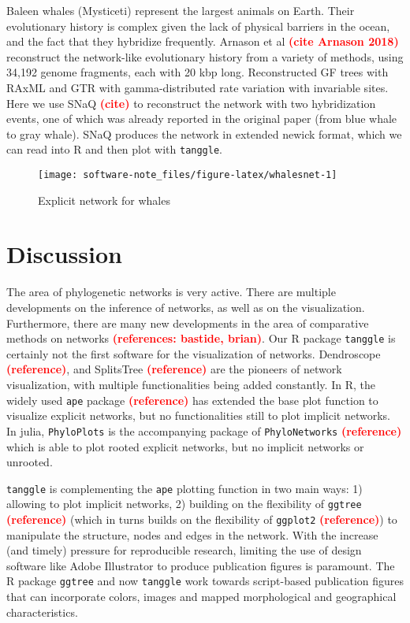 \documentclass[]{IEEEtran}
\begin{document}
Baleen whales (Mysticeti) represent the largest animals on Earth. Their
evolutionary history is complex given the lack of physical barriers in
the ocean, and the fact that they hybridize frequently. Arnason et al
\textcolor{red}{\textbf{(cite Arnason 2018)}} reconstruct the
network-like evolutionary history from a variety of methods, using
34,192 genome fragments, each with 20 kbp long. Reconstructed GF trees
with RAxML and GTR with gamma-distributed rate variation with invariable
sites. Here we use SNaQ \textcolor{red}{\textbf{(cite)}} to reconstruct
the network with two hybridization events, one of which was already
reported in the original paper (from blue whale to gray whale). SNaQ
produces the network in extended newick format, which we can read into R
and then plot with \texttt{tanggle}.

\begin{figure}[H]

{\centering \texttt{[image: software-note\_files/figure-latex/whalesnet-1]} 

}

\caption{Explicit network for whales}\label{fig:whalesnet}
\end{figure}

\hypertarget{discussion}{%
\section{Discussion}\label{discussion}}

The area of phylogenetic networks is very active. There are multiple
developments on the inference of networks, as well as on the
visualization. Furthermore, there are many new developments in the area
of comparative methods on networks
\textcolor{red}{\textbf{(references: bastide, brian)}}. Our R package
\texttt{tanggle} is certainly not the first software for the
visualization of networks. Dendroscope
\textcolor{red}{\textbf{(reference)}}, and SplitsTree
\textcolor{red}{\textbf{(reference)}} are the pioneers of network
visualization, with multiple functionalities being added constantly. In
R, the widely used \texttt{ape} package
\textcolor{red}{\textbf{(reference)}} has extended the base plot
function to visualize explicit networks, but no functionalities still to
plot implicit networks. In julia, \texttt{PhyloPlots} is the
accompanying package of \texttt{PhyloNetworks}
\textcolor{red}{\textbf{(reference)}} which is able to plot rooted
explicit networks, but no implicit networks or unrooted.

\texttt{tanggle} is complementing the \texttt{ape} plotting function in
two main ways: 1) allowing to plot implicit networks, 2) building on the
flexibility of \texttt{ggtree} \textcolor{red}{\textbf{(reference)}}
(which in turns builds on the flexibility of \texttt{ggplot2}
\textcolor{red}{\textbf{(reference)}}) to manipulate the structure,
nodes and edges in the network. With the increase (and timely) pressure
for reproducible research, limiting the use of design software like
Adobe Illustrator to produce publication figures is paramount. The R
package \texttt{ggtree} and now \texttt{tanggle} work towards
script-based publication figures that can incorporate colors, images and
mapped morphological and geographical characteristics.


\end{document}
